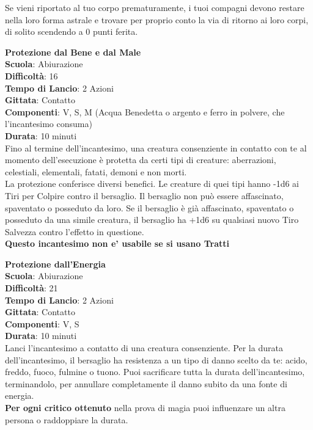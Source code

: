 \begin{multicols}{2}
Se vieni riportato al tuo corpo prematuramente, i tuoi compagni devono restare nella loro forma astrale e trovare per proprio conto la via di ritorno ai loro corpi, di solito scendendo a 0 punti ferita.

\medskip\textbf{Protezione dal Bene e dal Male}\\
\textbf{Scuola}: Abiurazione\\
\textbf{Difficoltà}: 16\\
\textbf{Tempo di Lancio}: 2 Azioni\\
\textbf{Gittata}: Contatto\\
\textbf{Componenti}: V, S, M (Acqua Benedetta o argento e ferro in polvere, che l'incantesimo consuma)\\
\textbf{Durata}: 10 minuti\\
Fino al termine dell'incantesimo, una creatura consenziente in contatto con te al momento dell'esecuzione è protetta da certi tipi di creature: aberrazioni, celestiali, elementali, fatati, demoni e non morti.\\
La protezione conferisce diversi benefici. Le creature di quei tipi hanno -1d6 ai Tiri per Colpire contro il bersaglio. Il bersaglio non può essere affascinato, spaventato o posseduto da loro. Se il bersaglio è già affascinato, spaventato o posseduto da una simile creatura, il bersaglio ha +1d6 su qualsiasi nuovo Tiro Salvezza contro l'effetto in questione.\\
\textbf{Questo incantesimo non e' usabile se si usano Tratti}

\medskip\textbf{Protezione dall'Energia}\\
\textbf{Scuola}: Abiurazione\\
\textbf{Difficoltà}: 21\\
\textbf{Tempo di Lancio}: 2 Azioni\\
\textbf{Gittata}: Contatto\\
\textbf{Componenti}: V, S\\
\textbf{Durata}: 10 minuti\\
Lanci l'incantesimo a contatto di una creatura consenziente. Per la durata dell'incantesimo, il bersaglio ha resistenza a un tipo di danno scelto da te: acido, freddo, fuoco, fulmine o tuono. Puoi sacrificare tutta la durata dell'incantesimo, terminandolo, per annullare completamente il danno subito da una fonte di energia.\\
\textbf{Per ogni critico ottenuto} nella prova di magia puoi influenzare un altra persona o raddoppiare la durata.\


\end{multicols}

